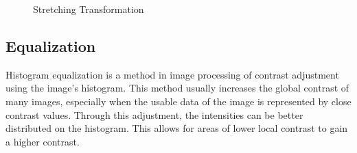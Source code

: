 \documentclass{article}
\begin{document}
	\begin{figure}[H]
	\centering
	\caption{Stretching Transformation}
	\label{fig:stretching}
	\end{figure}

	\subsection{Equalization}

	Histogram equalization is a method in image processing of contrast adjustment using the image's histogram. This method usually increases the global contrast 		of many images, especially when the usable data of the image is represented by close contrast values. Through this adjustment, the intensities can be better 		distributed on the histogram. This allows for areas of lower local contrast to gain a higher contrast. 
\end{document}
